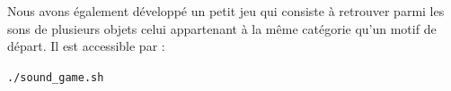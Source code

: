 \documentclass[a4paper,10pt]{article} %
\theoremstyle{definition} %
\begin{document}
Nous avons également développé un petit jeu qui consiste à retrouver parmi les sons de plusieurs objets celui appartenant à la même catégorie qu'un motif de départ. 
Il est accessible par :
\begin{center}
  \texttt{./sound\_game.sh}
\end{center}




\nocite{*}
\end{document}
